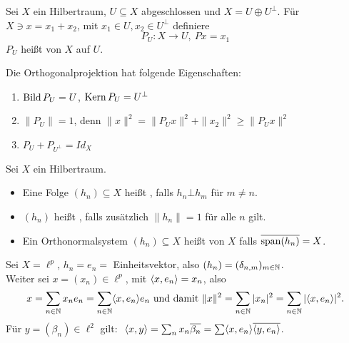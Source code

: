 \begin{definition*}
	Sei $X$ ein Hilbertraum, $U \subseteq X$ abgeschlossen und $X = U \oplus U^{\bot}$. Für $X \ni x = x_{1} + x_{2}$, mit $x_{1} \in U, x_{2} \in U^{\bot}$ definiere
		\[ P_{U} \colon X \rightarrow U, ~ P x = x_{1} \]
		$P_{U}$ hei{\ss}t  von $X$ auf $U$.	
\end{definition*}


\begin{folgerung}
	Die Orthogonalprojektion hat folgende Eigenschaften:
	\begin{enumerate}[label=\alph*\upshape)]
		\item $\mathop{\rm Bild}\nolimits P_{U} = U$, $\mathop{\rm Kern}\nolimits P_{U} = U^{\bot}$
		\item $\| P_{U} \| = 1$, denn $\| x \|^{2} = \| P_{U} x \|^{2} + \| x_{2} \|^{2} \geq \| P_{U} x \|^{2}$
		\item $P_{U} + P_{U^{\bot}} = Id_{X}$
	\end{enumerate}	
\end{folgerung}

\newpage %

\begin{definition}
	Sei $X$ ein Hilbertraum.
	\begin{itemize}
		\item Eine Folge $(h_{n}) \subseteq X$ hei{\ss}t , falls $h_{n} \bot h_{m}$ für $m \neq n$.
		\item $(h_{n})$ hei{\ss}t , falls zusätzlich $\| h_{n} \| = 1$ für alle $n$ gilt.
		\item Ein Orthonormalsystem $(h_{n}) \subseteq X$ hei{\ss}t  von $X$ falls $\overline{\operatorname{span}(h_{n})} = X$.
	\end{itemize}
\end{definition}


\begin{beispiel}
	Sei $X = \ell^{p}$, $h_{n} = e_{n} =$ Einheitsvektor, also $(h_{n}) = ( \delta_{n, m} )_{m \in \mathbb{N}}$. \\
	Weiter sei $x = (x_{n}) \in \ell^{p}$, mit $\langle x , e_{n} \rangle = x_{n}$, also 
	\[ x = \sum_{n \in \mathbb{N}} x_{n} e_{n} = \sum_{n \in \mathbb{N}} \langle x , e_{n} \rangle e_{n} \text{ und damit } \| x \|^{2} = \sum_{n \in \mathbb{N}} |x_{n}|^{2} = \sum_{n \in \mathbb{N}} | \langle x , e_{n} \rangle |^{2}. \]
	Für $y = (\beta_{n}) \in \ell^{2}$ gilt: $ $ $\langle x , y \rangle = \sum_{n} x_{n} \overline{\beta_{n}} = \sum \langle x , e_{n} \rangle \overline{ \langle y , e_{n} \rangle }$.
\end{beispiel}


